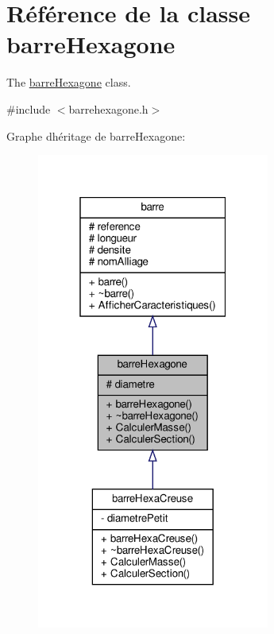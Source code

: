 \hypertarget{classbarre_hexagone}{}\section{Référence de la classe barre\+Hexagone}
\label{classbarre_hexagone}


The \hyperlink{classbarre_hexagone}{barre\+Hexagone} class.  




{\ttfamily \#include $<$barrehexagone.\+h$>$}



Graphe d\textquotesingle{}héritage de barre\+Hexagone\+:
\nopagebreak
\begin{figure}[H]
\begin{center}
\leavevmode
\includegraphics[width=217pt]{classbarre_hexagone__inherit__graph}
\end{center}
\end{figure}


